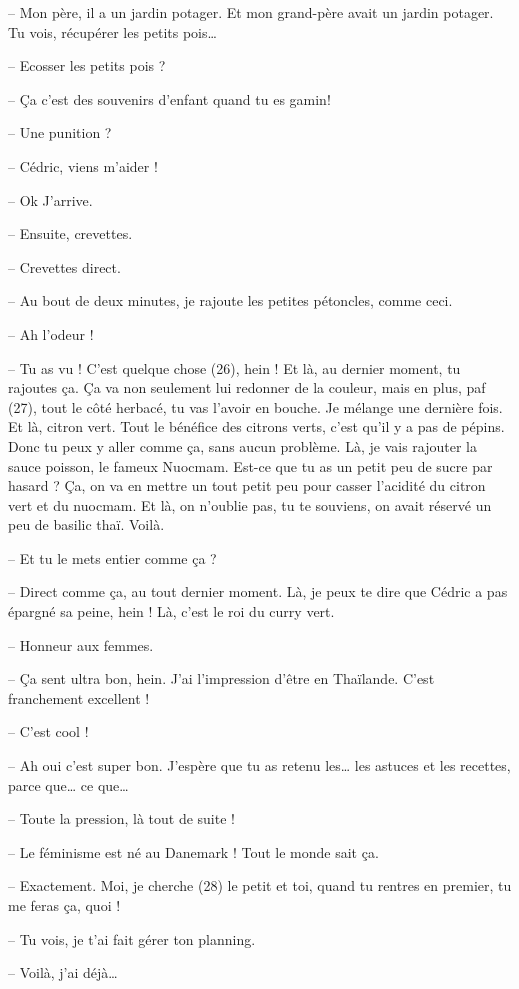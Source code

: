 \documentclass[11pt, french]{report}
\begin{document}
-- Mon père, il a un jardin potager. Et mon grand-père avait un jardin potager. Tu
vois, récupérer les petits pois…

-- Ecosser les petits pois ?

-- Ça c’est des souvenirs d’enfant quand tu es gamin!

-- Une punition ?

-- Cédric, viens m’aider !

-- Ok J’arrive.

-- Ensuite, crevettes.

-- Crevettes direct.

-- Au bout de deux minutes, je rajoute les petites pétoncles, comme ceci.

-- Ah l’odeur !

-- Tu as vu ! C’est quelque chose (26), hein ! Et là, au dernier moment, tu
rajoutes ça. Ça va non seulement lui redonner de la couleur, mais en plus,
paf (27), tout le côté herbacé, tu vas l’avoir en bouche. Je mélange une dernière
fois. Et là, citron vert. Tout le bénéfice des citrons verts, c’est qu’il y a pas
de pépins. Donc tu peux y aller comme ça, sans aucun problème. Là, je vais
rajouter la sauce poisson, le fameux Nuocmam. Est-ce que tu as un petit peu de
sucre par hasard ? Ça, on va en mettre un tout petit peu pour casser l’acidité du
citron vert et du nuocmam. Et là, on n’oublie pas, tu te souviens, on avait
réservé un peu de basilic thaï. Voilà.

-- Et tu le mets entier comme ça ?

-- Direct comme ça, au tout dernier moment. Là, je peux te dire que Cédric a pas
épargné sa peine, hein ! Là, c’est le roi du curry vert.

-- Honneur aux femmes.

-- Ça sent ultra bon, hein. J’ai l’impression d’être en Thaïlande. C’est
franchement excellent !

-- C’est cool !

-- Ah oui c’est super bon. J’espère que tu as retenu les… les astuces et les
recettes, parce que… ce que…

-- Toute la pression, là tout de suite !

-- Le féminisme est né au Danemark ! Tout le monde sait ça.

-- Exactement. Moi, je cherche (28) le petit et toi, quand tu rentres en premier,
tu me feras ça, quoi !

-- Tu vois, je t’ai fait gérer ton planning.

-- Voilà, j’ai déjà…
\end{document}
